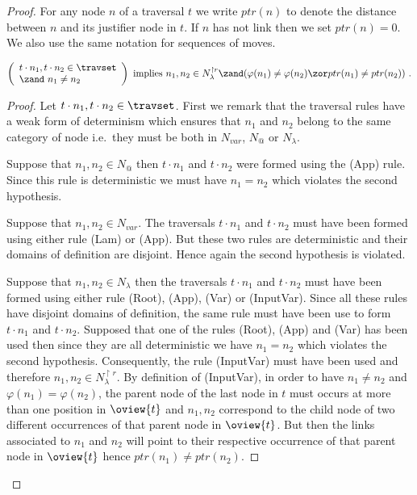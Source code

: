 \begin{proof}
For any node $n$ of a traversal $t$ we write $ptr(n)$ to denote the distance between $n$ and its justifier node in $t$. If $n$ has not link then we set $ptr(n)=0$. We also use the same notation for sequences of moves.

\begin{lemma}
\label{lem:varphiinjective:prelem}
\begin{equation}
\left(
  \begin{array}{ll}
    t \cdot n_1, t \cdot n_2 \in \travset \\
    \zand\ n_1 \neq n_2
  \end{array}
\right)
 \mbox{ implies } n_1,n_2 \in N^{\upharpoonright r}_{\lambda} \zand ( \varphi(n_1) \neq \varphi(n_2) \zor ptr(n_1) \neq ptr(n_2) ) \ . \end{equation}
\end{lemma}
\begin{proof}
Let $t \cdot n_1, t \cdot n_2 \in \travset$.
First we remark that the traversal rules have a weak form of determinism which ensures that $n_1$ and $n_2$ belong to the same category of node i.e.\ they must be both in $N_{var}$, $N_@$ or $N_\lambda$.

Suppose that $n_1, n_2 \in N_@$ then $t \cdot n_1$ and $t \cdot n_2$ were formed using the (App) rule. Since this rule is deterministic we must have $n_1=n_2$ which violates the second hypothesis.


Suppose that $n_1,n_2\in N_{var}$. The traversals $t \cdot n_1$ and $t \cdot n_2$ must have been formed using either rule (Lam) or (App). But these two rules are deterministic and their domains of definition are disjoint. Hence again the second hypothesis is violated.

Suppose that $n_1,n_2\in N_\lambda$ then
the traversals $t \cdot n_1$ and $t \cdot n_2$ must have been formed using either rule (Root), (App), (Var) or (InputVar). Since all these rules have disjoint domains of definition, the same rule must have been use to form $t \cdot n_1$ and $t \cdot n_2$. Supposed that one of the rules (Root), (App) and (Var) has been used then since they are all deterministic we have $n_1=n_2$ which violates the second hypothesis. Consequently, the rule (InputVar) must have been used and therefore $n_1,n_2 \in N_\lambda^{\upharpoonright r}$. By definition of (InputVar), in order to have $n_1\neq n_2$ and $\varphi(n_1) = \varphi(n_2)$, the parent node of the last node in $t$ must occurs at more than one position in $\oview{t}$ and $n_1,n_2$ correspond to the child node of two different occurrences of that parent node in $\oview{t}$. But then the links associated to $n_1$ and $n_2$ will point to their respective occurrence of that parent node in $\oview{t}$ hence $ptr(n_1) \neq ptr(n_2)$.
\end{proof}


\end{proof}
